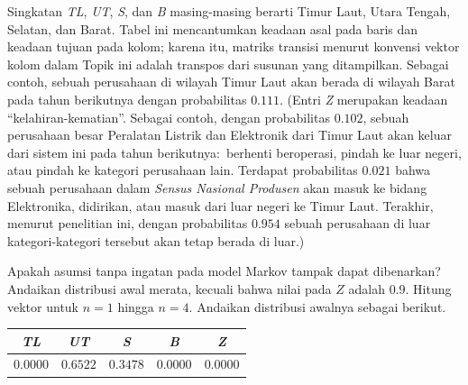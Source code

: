 \begin{exercises}
{\begin{center}
\begin{tabular}{c|ccccc}
      \end{tabular}
    \end{center}}
    Singkatan \textit{TL}, \textit{UT}, \textit{S}, dan \textit{B}
    masing-masing berarti Timur Laut, Utara Tengah, Selatan, dan Barat.
    Tabel ini mencantumkan keadaan asal pada baris dan keadaan tujuan pada
    kolom; karena itu, matriks transisi menurut konvensi vektor kolom dalam
    Topik ini adalah transpos dari susunan yang ditampilkan.
    Sebagai contoh, sebuah perusahaan di wilayah Timur Laut akan berada di
    wilayah Barat pada tahun berikutnya dengan probabilitas $0.111$.
    (Entri \textit{Z} merupakan keadaan ``kelahiran-kematian''.
     Sebagai contoh, dengan probabilitas $0.102$, sebuah perusahaan besar
     Peralatan Listrik dan Elektronik dari Timur Laut akan keluar dari sistem
     ini pada tahun berikutnya:~berhenti beroperasi, pindah ke luar negeri,
     atau pindah ke kategori perusahaan lain.
     Terdapat probabilitas $0.021$ bahwa sebuah perusahaan dalam
     \emph{Sensus Nasional Produsen} akan masuk ke bidang Elektronika,
     didirikan, atau masuk dari luar negeri ke Timur Laut.
     Terakhir, menurut penelitian ini, dengan probabilitas $0.954$ sebuah
     perusahaan di luar kategori-kategori tersebut akan tetap berada di luar.)
    \begin{exparts}
      \partsitem Apakah asumsi tanpa ingatan pada model Markov tampak dapat
        dibenarkan?
      \partsitem Andaikan distribusi awal merata, kecuali bahwa nilai pada $Z$
        adalah $0.9$. Hitung vektor untuk $n=1$ hingga $n=4$.
      \partsitem Andaikan distribusi awalnya sebagai berikut.
        \begin{center}
          \begin{tabular}{ccccc}
              \textit{TL}      
              &\textit{UT}      
              &\textit{S}       
              &\textit{B}       
              &\textit{Z}       \\ \hline
              $0.0000$ &$0.6522$ &$0.3478$ &$0.0000$ &$0.0000$
          \end{tabular}
        \end{center}

\end{exparts}
\end{exercises}

